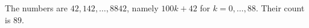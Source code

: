 The numbers are $42,142,\ldots,8842$, namely $100k+42$ for $k=0,\ldots,88$. Their count is $\boxed{89}$.
